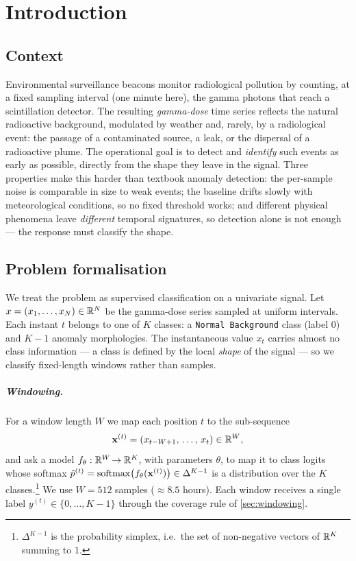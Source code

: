 \chapter{Introduction}
\label{chap:intro}

\section{Context}
\label{sec:context}

Environmental surveillance beacons monitor radiological pollution by counting,
at a fixed sampling interval (one minute here), the gamma photons that reach a
scintillation detector. The resulting \emph{gamma-dose} time series reflects the
natural radioactive background, modulated by weather and, rarely, by a
radiological event: the passage of a contaminated source, a leak, or the
dispersal of a radioactive plume. The operational goal is to detect and
\emph{identify} such events as early as possible, directly from the shape they
leave in the signal. Three properties make this harder than textbook anomaly
detection: the per-sample noise is comparable in size to weak events; the
baseline drifts slowly with meteorological conditions, so no fixed threshold
works; and different physical phenomena leave \emph{different} temporal
signatures, so detection alone is not enough --- the response must classify the
shape.

\section{Problem formalisation}
\label{sec:problem}

We treat the problem as supervised classification on a univariate signal.
Let $x = (x_1,\dots,x_N) \in \mathbb{R}^{N}$ be the gamma-dose series sampled at uniform
intervals. Each instant $t$ belongs to one of $K$ classes: a \texttt{Normal
Background} class (label $0$) and $K-1$ anomaly morphologies. The instantaneous
value $x_t$ carries almost no class information --- a class is defined by the
local \emph{shape} of the signal --- so we classify fixed-length windows rather
than samples.

\paragraph{Windowing.} For a window length $W$ we map each position $t$ to the
sub-sequence
\begin{equation}
    \mathbf{x}^{(t)} = (x_{t-W+1},\,\dots,\,x_t) \in \mathbb{R}^{W},
    \label{eq:window}
\end{equation}
and ask a model $f_\theta:\mathbb{R}^{W}\!\to\mathbb{R}^{K}$, with parameters $\theta$, to map it
to class logits whose softmax
$\hat{p}^{(t)} = \operatorname{softmax}\!\big(f_\theta(\mathbf{x}^{(t)})\big) \in \Delta^{K-1}$
is a distribution over the $K$ classes.\footnote{$\Delta^{K-1}$ is the
probability simplex, i.e.\ the set of non-negative vectors of $\mathbb{R}^{K}$ summing to
$1$.} We use $W=512$ samples ($\approx 8.5$ hours). Each window receives a single
label $y^{(t)}\in\{0,\dots,K-1\}$ through the coverage rule of
\cref{sec:windowing}.

